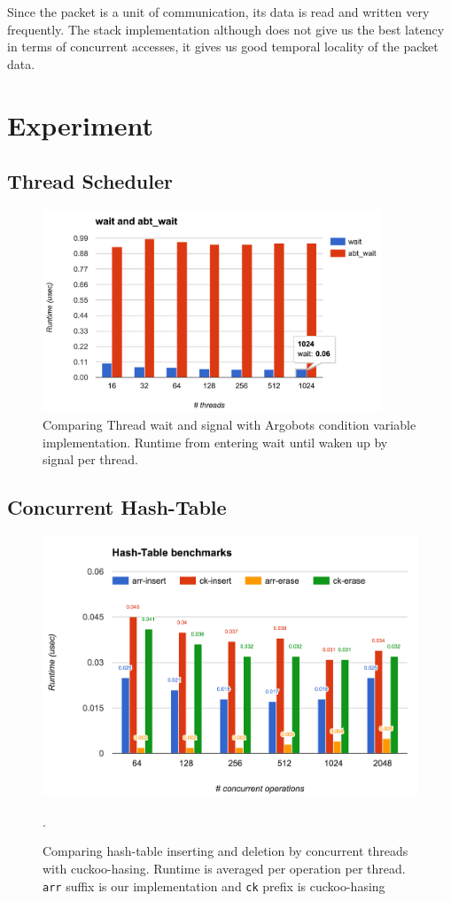 \documentclass[11pt]{article}
\begin{document}
Since the packet is a unit of communication, its data is read and written very
frequently. The stack implementation although does not give us the best latency
in terms of concurrent accesses, it gives us good temporal locality of the
packet data.

\section{Experiment}
\subsection{Thread Scheduler}
\begin{figure}[h]
  \centering 
  \includegraphics[width=0.9\textwidth]{fig/thread.png}
  \caption{Comparing Thread wait and signal with Argobots condition variable
  implementation. Runtime from entering wait until waken up by signal per thread.}

\end{figure}

\newpage

\subsection{Concurrent Hash-Table}
\begin{figure}[h!]
  \centering 
  \includegraphics[width=\textwidth]{fig/hashtbl.png}
  \caption{Comparing hash-table inserting and deletion by concurrent threads
    with cuckoo-hasing.  Runtime is averaged per operation per thread.
    \texttt{arr} suffix is our implementation and \texttt{ck} prefix is cuckoo-hasing}.
\end{figure}
\end{document}
